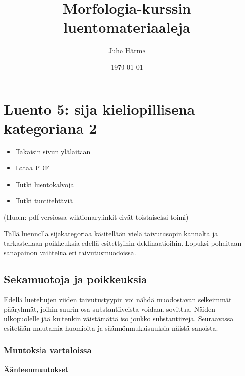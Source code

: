 \documentclass[]{scrartcl}
\author{Juho Härme}
\title{Morfologia-kurssin luentomateriaaleja}
\date{\today}
\providecommand{\tightlist}{%
  \setlength{\itemsep}{0pt}\setlength{\parskip}{0pt}}
\begin{document}
\maketitle
\tableofcontents
\newpage



\section{Luento 5: sija kieliopillisena kategoriana
2}\label{luento-5-sija-kieliopillisena-kategoriana-2}

\begin{itemize}
\tightlist
\item
  \href{https://mustikka.uta.fi/~juho_harme/morfologia/\#tästä-kurssista}{Takaisin
  sivun ylälaitaan}
\item
  \href{http://mustikka.uta.fi/~juho_harme/morfologia/materiaalit/luento5.pdf}{Lataa
  PDF}
\item
  \href{http://mustikka.uta.fi/~juho_harme/morfologia/presentations/luento5.html}{Tutki
  luentokalvoja}
\item
  \href{http://mustikka.uta.fi/~juho_harme/morfologia/tehtavat/luento5.pdf}{Tutki
  tuntitehtäviä}
\end{itemize}

(Huom: pdf-versiossa wiktionarylinkit eivät toistaiseksi toimi)

Tällä luennolla sijakategoriaa käsitellään vielä taivutusopin kannalta
ja tarkastellaan poikkeuksia edellä esitettyihin deklinaatioihin. Lopuksi pohditaan
sanapainon vaihtelua eri taivutusmuodoissa.

\subsection{Sekamuotoja ja
poikkeuksia}\label{sekamuotoja-ja-poikkeuksia}

Edellä lueteltujen viiden taivutustyypin voi nähdä muodostavan
selkeimmät pääryhmät, joihin suurin osa substantiiveista voidaan
sovittaa. Näiden ulkopuolelle jää kuitenkin väistämättä iso joukko
substantiiveja. Seuraavassa esitetään muutamia huomioita ja
säännönmukaisuuksia näistä sanoista.

\subsubsection{Muutoksia vartaloissa}\label{muutoksia-vartaloissa}

\paragraph{Äänteenmuutokset}\label{uxe4uxe4nteenmuutokset}
\end{document}
